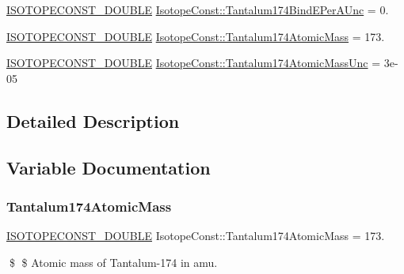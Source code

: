 \begin{DoxyCompactItemize}
\mbox{\hyperlink{group___isotope_const-_macros_ga8f45a7272ce02c0b4c65c44636ed719a}{I\+S\+O\+T\+O\+P\+E\+C\+O\+N\+S\+T\+\_\+\+D\+O\+U\+B\+LE}} \mbox{\hyperlink{group___isotope_const-_tantalum-_ta174_ga3a624d4ad81480c9a4b4a045b59c18c0}{Isotope\+Const\+::\+Tantalum174\+Bind\+E\+Per\+A\+Unc}} = 0.
\item 
\mbox{\hyperlink{group___isotope_const-_macros_ga8f45a7272ce02c0b4c65c44636ed719a}{I\+S\+O\+T\+O\+P\+E\+C\+O\+N\+S\+T\+\_\+\+D\+O\+U\+B\+LE}} \mbox{\hyperlink{group___isotope_const-_tantalum-_ta174_gab0cd6b2581879e53cd38a7c8c57b1ba9}{Isotope\+Const\+::\+Tantalum174\+Atomic\+Mass}} = 173.
\item 
\mbox{\hyperlink{group___isotope_const-_macros_ga8f45a7272ce02c0b4c65c44636ed719a}{I\+S\+O\+T\+O\+P\+E\+C\+O\+N\+S\+T\+\_\+\+D\+O\+U\+B\+LE}} \mbox{\hyperlink{group___isotope_const-_tantalum-_ta174_ga110418ed02e56a0db46b2e970a5b6d01}{Isotope\+Const\+::\+Tantalum174\+Atomic\+Mass\+Unc}} = 3e-\/05
\end{DoxyCompactItemize}


\subsection{Detailed Description}


\subsection{Variable Documentation}
\mbox{\label{group___isotope_const-_tantalum-_ta174_gab0cd6b2581879e53cd38a7c8c57b1ba9}} 
\subsubsection{\texorpdfstring{Tantalum174\+Atomic\+Mass}{Tantalum174AtomicMass}}
{\footnotesize\ttfamily \mbox{\hyperlink{group___isotope_const-_macros_ga8f45a7272ce02c0b4c65c44636ed719a}{I\+S\+O\+T\+O\+P\+E\+C\+O\+N\+S\+T\+\_\+\+D\+O\+U\+B\+LE}} Isotope\+Const\+::\+Tantalum174\+Atomic\+Mass = 173.}

\$ \$ Atomic mass of Tantalum-\/174 in amu. \mbox{\label{group___isotope_const-_tantalum-_ta174_ga110418ed02e56a0db46b2e970a5b6d01}} 
